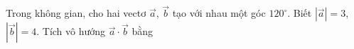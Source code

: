 \begin{ex}
Trong không gian, cho hai vectơ $\vec{a}$, $\vec{b}$ tạo với nhau một góc $120^\circ$. Biết $|\vec{a}|=3$, $|\vec{b}|=4$. Tích vô hướng $\vec{a}\cdot\vec{b}$ bằng
\end{ex}
